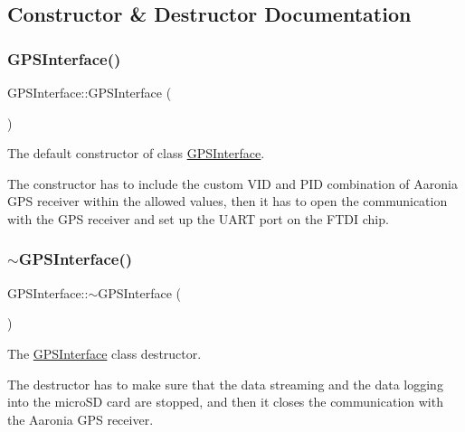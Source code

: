 \subsection{Constructor \& Destructor Documentation}
\mbox{\label{classGPSInterface_a91c9f19d6588bcd34a8038bdc036c20c}} 
\subsubsection{\texorpdfstring{G\+P\+S\+Interface()}{GPSInterface()}}
{\footnotesize\ttfamily G\+P\+S\+Interface\+::\+G\+P\+S\+Interface (\begin{DoxyParamCaption}{ }\end{DoxyParamCaption})}



The default constructor of class \hyperlink{classGPSInterface}{G\+P\+S\+Interface}. 

The constructor has to include the custom V\+ID and P\+ID combination of Aaronia G\+PS receiver within the allowed values, then it has to open the communication with the G\+PS receiver and set up the U\+A\+RT port on the F\+T\+DI chip. \mbox{\label{classGPSInterface_ac8156be0348867ab39ba6e7909e16c3b}} 
\subsubsection{\texorpdfstring{$\sim$\+G\+P\+S\+Interface()}{~GPSInterface()}}
{\footnotesize\ttfamily G\+P\+S\+Interface\+::$\sim$\+G\+P\+S\+Interface (\begin{DoxyParamCaption}{ }\end{DoxyParamCaption})}



The \hyperlink{classGPSInterface}{G\+P\+S\+Interface} class\textquotesingle{} destructor. 

The destructor has to make sure that the data streaming and the data logging into the micro\+SD card are stopped, and then it closes the communication with the Aaronia G\+PS receiver. 

